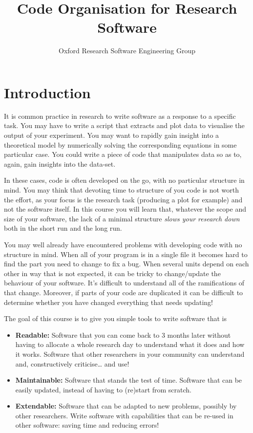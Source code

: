 \documentclass[a4paper]{article}
\begin{document}
\title{Code Organisation for Research Software}
\author{Oxford Research Software Engineering Group}
\maketitle

\section{Introduction}
It is common practice in research to write software as a response to a specific task.
You may have to write a script that extracts and plot data to visualise the output of your experiment.
You may want to rapidly gain insight into a theoretical model by numerically solving the corresponding equations in some particular case.
You could write a piece of code that manipulates data so as to, again, gain insights into the data-set.

In these cases, code is often developed on the go, with no particular structure in mind.
You may think that devoting time to structure of you code is not worth the effort, as your focus is the research task (producing a plot for example) and not the software itself.
In this course you will learn that, whatever the scope and size of your software, the lack of a minimal structure \textit{slows your research down} both in the short run and the long run.

You may well already have encountered problems with developing code with no structure in mind.
When all of your program is in a single file it becomes hard to find the part you need to change to fix a bug.
When several units depend on each other in way that is not expected, it can be tricky to change/update the behaviour of your software.
It's difficult to understand all of the ramifications of that change.
Moreover, if parts of your code are duplicated it can be difficult to determine whether you have changed everything that needs updating!

The goal of this course is to give you simple tools to write software that is
\begin{itemize}
\item \textbf{Readable:} Software that you can come back to 3 months later without having to allocate a whole research day to understand what it does and how it works.
  Software that other researchers in your community can understand and, constructively criticise\ldots
and use!
\item \textbf{Maintainable:} Software that stands the test of time.
Software that can be easily updated, instead of having to (re)start from scratch.
\item \textbf{Extendable:} Software that can be adapted to new problems, possibly by other researchers.
Write software with capabilities that can be re-used in other software: saving time and reducing errors!
\end{itemize}
\end{document}
